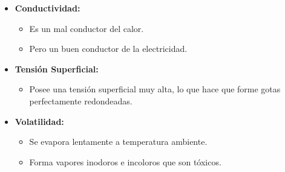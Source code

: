 \begin{frame}
  \begin{itemize}
      \item \textbf{Conductividad:}
          \begin{itemize}
              \item Es un mal conductor del calor.
              \item Pero un buen conductor de la electricidad.
          \end{itemize}
      \medskip
      \item \textbf{Tensión Superficial:}
          \begin{itemize}
              \item Posee una tensión superficial muy alta, lo que 
								hace que forme gotas perfectamente redondeadas.
          \end{itemize}
      \medskip
      \item \textbf{Volatilidad:}
          \begin{itemize}
              \item Se evapora lentamente a temperatura ambiente.
              \item Forma vapores inodoros e incoloros que son tóxicos.
          \end{itemize}
  \end{itemize}
\end{frame}


